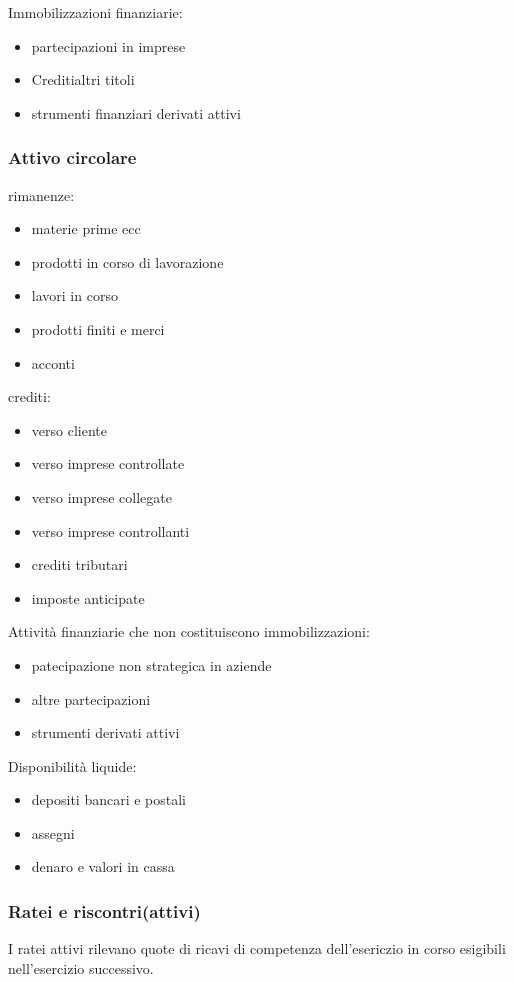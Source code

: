 Immobilizzazioni finanziarie:
\begin{itemize}
    \item partecipazioni in imprese
    \item Creditialtri titoli
    \item strumenti finanziari derivati attivi
\end{itemize}

\subsubsection{Attivo circolare}
rimanenze:
\begin{itemize}
    \item materie prime ecc
    \item prodotti in corso di lavorazione
    \item lavori in corso
    \item prodotti finiti e merci
    \item acconti
\end{itemize}

crediti:
\begin{itemize}
    \item verso cliente
    \item verso imprese controllate
    \item verso imprese collegate
    \item verso imprese controllanti
    \item crediti tributari
    \item imposte anticipate
\end{itemize}

Attività finanziarie che non costituiscono immobilizzazioni:
\begin{itemize}
    \item patecipazione non strategica in aziende
    \item altre partecipazioni
    \item strumenti derivati attivi
\end{itemize}

Disponibilità liquide:
\begin{itemize}
    \item depositi bancari e postali
    \item assegni
    \item denaro e valori in cassa
\end{itemize}


\subsubsection{Ratei e riscontri(attivi)}
I ratei attivi rilevano quote di ricavi di competenza dell'esericzio in corso
esigibili nell'esercizio successivo.

